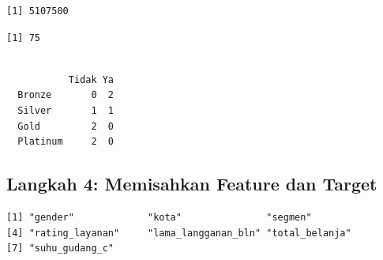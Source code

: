 \documentclass[
  indonesian,
  letterpaper,
]{book}
\newenvironment{Shaded}{\begin{snugshade}}{\end{snugshade}}
\newcommand{\CommentTok}[1]{\textcolor[rgb]{0.37,0.37,0.37}{#1}}
\newcommand{\FunctionTok}[1]{\textcolor[rgb]{0.28,0.35,0.67}{#1}}
\newcommand{\NormalTok}[1]{\textcolor[rgb]{0.00,0.23,0.31}{#1}}
\newcommand{\OtherTok}[1]{\textcolor[rgb]{0.00,0.23,0.31}{#1}}
\newcommand{\SpecialCharTok}[1]{\textcolor[rgb]{0.37,0.37,0.37}{#1}}
\newcommand{\StringTok}[1]{\textcolor[rgb]{0.13,0.47,0.30}{#1}}
\begin{document}
\begin{verbatim}
[1] 5107500
\end{verbatim}

\begin{Shaded}
\end{Shaded}

\begin{verbatim}
[1] 75
\end{verbatim}

\begin{Shaded}
\end{Shaded}

\begin{verbatim}
          
           Tidak Ya
  Bronze       0  2
  Silver       1  1
  Gold         2  0
  Platinum     2  0
\end{verbatim}

\subsection{Langkah 4: Memisahkan Feature dan
Target}\label{langkah-4-memisahkan-feature-dan-target}

\begin{Shaded}
\end{Shaded}

\begin{verbatim}
[1] "gender"             "kota"               "segmen"            
[4] "rating_layanan"     "lama_langganan_bln" "total_belanja"     
[7] "suhu_gudang_c"     
\end{verbatim}
\end{document}
